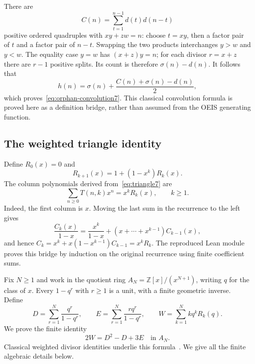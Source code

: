\documentclass[11pt]{article}
\newcommand{\Z}{\mathbb Z}
\begin{document}
There are
\[
C(n)=\sum_{t=1}^{n-1}d(t)d(n-t)
\]
positive ordered quadruples with $xy+zw=n$: choose $t=xy$, then a
factor pair of $t$ and a factor pair of $n-t$. Swapping the two products
interchanges $y>w$ and $y<w$. The equality case $y=w$ has
$(x+z)y=n$; for each divisor $r=x+z$ there are $r-1$ positive splits.
Its count is therefore $\sigma(n)-d(n)$. It follows that
\[
h(n)=\sigma(n)+\frac{C(n)+\sigma(n)-d(n)}2,
\]
which proves~\eqref{eq:orphan-convolution7}. This classical convolution
formula is proved here as a definition bridge, rather than assumed from
the OEIS generating function.

\subsection{The weighted triangle identity}

Define $R_0(x)=0$ and
\begin{equation}\label{eq:R7}
R_{k+1}(x)=1+(1-x^k)R_k(x).
\end{equation}
The column polynomials derived from~\eqref{eq:triangle7} are
\begin{equation}\label{eq:column7}
\sum_{n\ge0}T(n,k)x^n=x^kR_k(x),\qquad k\ge1.
\end{equation}
Indeed, the first column is $x$. Moving the last sum in the recurrence
to the left gives
\[
\frac{C_k(x)}{1-x}=\frac{x^k}{1-x}
 +(x+\cdots+x^{k-1})C_{k-1}(x),
\]
and hence $C_k=x^k+x(1-x^{k-1})C_{k-1}=x^kR_k$.
The reproduced Lean module proves this bridge by induction on the
original recurrence using finite coefficient sums.

Fix $N\ge1$ and work in the quotient ring
$A_N=\Z[x]/(x^{N+1})$, writing $q$ for the class of $x$.
Every $1-q^r$ with $r\ge1$ is a unit, with a finite geometric inverse.
Define
\[
D=\sum_{r=1}^{N}\frac{q^r}{1-q^r},\qquad
E=\sum_{r=1}^{N}\frac{r q^r}{1-q^r},\qquad
W=\sum_{k=1}^{N}kq^kR_k(q).
\]
We prove the finite identity
\begin{equation}\label{eq:weighted7}
\boxed{2W=D^2-D+3E\quad\text{in }A_N.}
\end{equation}
Classical weighted divisor identities underlie this
formula~\cite{Uchimura,Bressoud,Agarwal}.
We give all the finite algebraic details below.
\end{document}

